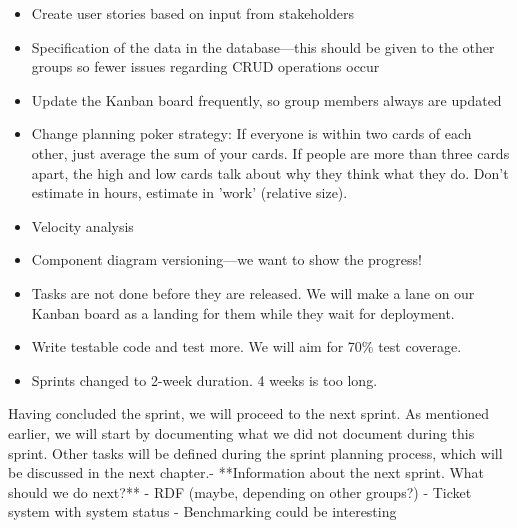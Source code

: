 \begin{itemize}
    \item Create user stories based on input from stakeholders
    \item Specification of the data in the database---this should be given to the other groups so fewer issues regarding CRUD operations occur
    \item Update the Kanban board frequently, so group members always are updated
    \item Change planning poker strategy:
    \subitem If everyone is within two cards of each other, just average the sum of your cards.
    \subitem If people are more than three cards apart, the high and low cards talk about why they think what they do.
    \subitem Don't estimate in hours, estimate in 'work' (relative size).
    \item Velocity analysis
    \item Component diagram versioning---we want to show the progress!
    \item Tasks are not done before they are released. We will make a lane on our Kanban board as a landing for them while they wait for deployment.
    \item Write testable code and test more. We will aim for 70\% test coverage.
    \item Sprints changed to 2-week duration. 4 weeks is too long.
\end{itemize}

Having concluded the sprint, we will proceed to the next sprint. As mentioned earlier, we will start by documenting what we did not document during this sprint. Other tasks will be defined during the sprint planning process, which will be discussed in the next chapter.- **Information about the next sprint. What should we do next?**
- RDF (maybe, depending on other groups?)
- Ticket system with system status
- Benchmarking could be interesting